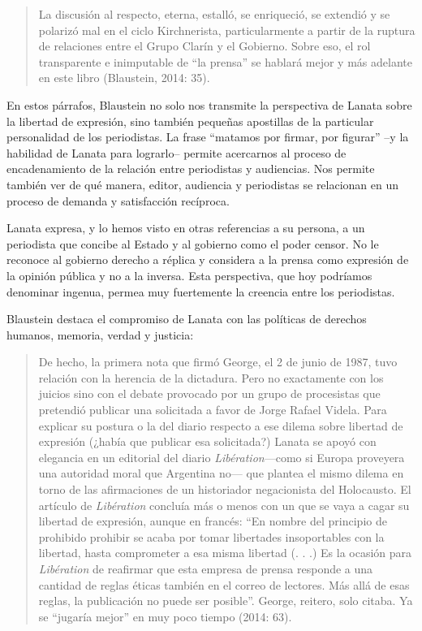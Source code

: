 \begin{quote}
La discusión al respecto, eterna, estalló, se enriqueció, se extendió y se polarizó mal en el ciclo Kirchnerista, particularmente a partir de la ruptura de relaciones entre el Grupo Clarín y el Gobierno. Sobre eso, el rol transparente e inimputable de ``la prensa'' se hablará mejor y más adelante en este libro (Blaustein, 2014: 35).
\end{quote}

En estos párrafos, Blaustein no solo nos transmite la perspectiva de Lanata sobre la libertad de expresión, sino también pequeñas apostillas de la particular personalidad de los periodistas. La frase ``matamos por firmar, por figurar'' --y la habilidad de Lanata para lograrlo-- permite acercarnos al proceso de encadenamiento de la relación entre periodistas y audiencias. Nos permite también ver de qué manera, editor, audiencia y periodistas se relacionan en un proceso de demanda y satisfacción recíproca.

Lanata expresa, y lo hemos visto en otras referencias a su persona, a un periodista que concibe al Estado y al gobierno como el poder censor. No le reconoce al gobierno derecho a réplica y considera a la prensa como expresión de la opinión pública y no a la inversa. Esta perspectiva, que hoy podríamos denominar ingenua, permea muy fuertemente la creencia entre los periodistas.

Blaustein destaca el compromiso de Lanata con las políticas de derechos humanos, memoria, verdad y justicia:

\begin{quote}
De hecho, la primera nota que firmó George, el 2 de junio de 1987, tuvo relación con la herencia de la dictadura. Pero no exactamente con los juicios sino con el debate provocado por un grupo de procesistas que pretendió publicar una solicitada a favor de Jorge Rafael Videla. Para explicar su postura o la del diario respecto a ese dilema sobre libertad de expresión (¿había que publicar esa solicitada?) Lanata se apoyó con elegancia en un editorial del diario \emph{Libération}---como si Europa proveyera una autoridad moral que Argentina no--- que plantea el mismo dilema en torno de las afirmaciones de un historiador negacionista del Holocausto. El artículo de \emph{Libération} concluía más o menos con un que se vaya a cagar su libertad de expresión, aunque en francés: ``En nombre del principio de prohibido prohibir se acaba por tomar libertades insoportables con la libertad, hasta comprometer a esa misma libertad (. . .) Es la ocasión para \emph{Libération} de reafirmar que esta empresa de prensa responde a una cantidad de reglas éticas también en el correo de lectores. Más allá de esas reglas, la publicación no puede ser posible''. George, reitero, solo citaba. Ya se ``jugaría mejor'' en muy poco tiempo (2014: 63).
\end{quote}

